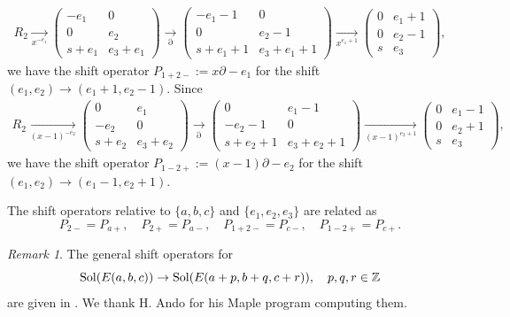 \documentclass[a4paper,12pt]{article}
\theoremstyle{definition}
\theoremstyle{remark}
\newtheorem{remark}[thm]{Remark}
\numberwithin{equation}{section} %
\begin{document}
\[ \begin{array}{l}         %
R_2 %
 \underset{x^{-e_1}}{\to}
\left( \begin{array}{cc}
-e_1&0\\
0&e_2\\
s+e_1&e_3+e_1\end{array}\right)\underset{\partial}{\to}
\left( \begin{array}{cc}
-e_1-1&0\\
0&e_2-1\\
s+e_1+1&e_3+e_1+1\end{array}\right) %
 \underset{x^{e_1+1}}{\to}
\left( \begin{array}{cc}
0&e_1+1\\
0&e_2-1\\
s&e_3\end{array}\right),
\end{array} \]
we have the shift operator $P_{1+2-}:=x\partial-e_1$  for the shift $(e_1,e_2)\to(e_1+1,e_2-1)$. Since
\[ \begin{array}{l}     
R_2  %
\underset{(x-1)^{-e_2}}{\to}
\left( \begin{array}{cc}
0&e_1\\
-e_2&0\\
s+e_2&e_3+e_2\end{array}\right)\underset{\partial}{\to}
\left( \begin{array}{cc}
0&e_1-1\\
-e_2-1&0\\
s+e_2+1&e_3+e_2+1\end{array}\right)%
\underset{(x-1)^{e_2+1}}{\to}
\left( \begin{array}{cc}
0&e_1-1\\
0&e_2+1\\
s&e_3\end{array}\right),
\end{array}\]
we have the shift operator  $P_{1-2+}:=(x-1)\partial-e_2$  for the shift $(e_1,e_2)\to(e_1-1,e_2+1)$.

The shift operators relative to $\{a,b,c\}$ and $\{e_1, e_2,e_3\}$ are
related as
$$P_{2-}=P_{a+},\quad P_{2+}=P_{a-},\quad P_{1+2-}=P_{c-},\quad P_{1-2+}=P_{c+}.$$

\begin{remark}\label{E2ShiftGen}
The general shift operators for 
$$ {\rm Sol}(E(a,b,c))\to{\rm Sol}(E(a+p,b+q,c+r)),\quad p,q,r\in \mathbb{Z}$$
are given in \cite{Eb1, Eb2}. We thank H. Ando for his Maple program computing them.
\end{remark}
\end{document}
